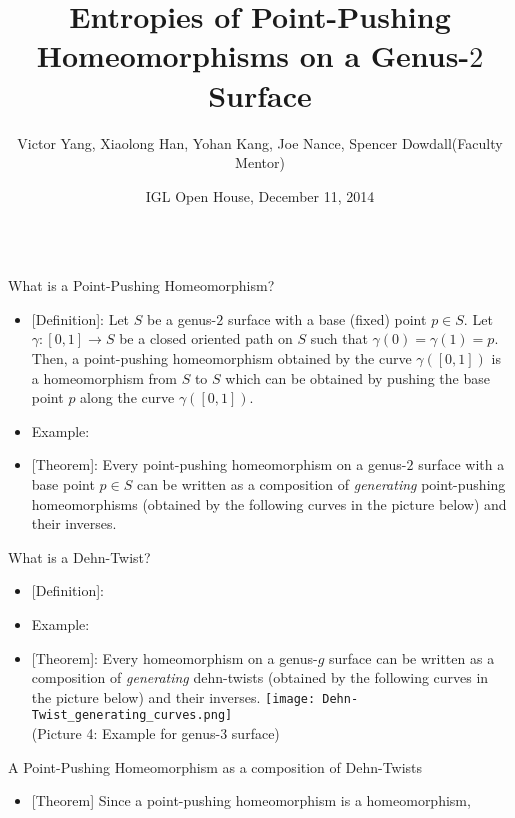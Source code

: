 \documentclass[leqno,presentation]{beamer}
\title{
\veryHuge
Entropies of Point-Pushing Homeomorphisms on a Genus-$2$ Surface}
\author{
  \LARGE
  Victor Yang,
  Xiaolong Han,
  Yohan Kang,
  Joe Nance,
  Spencer Dowdall(Faculty Mentor)}
\institute{
\raisebox{-2ex}{\texttt{[image: uiuc\_logo.pdf]}}
\hspace{4em}
\raisebox{-2ex}{\texttt{[image: igl-logo-small.png]}}
\hspace{1em} 
{\Large\textcolor{red!50!orange}{ Illinois Geometry Lab}}
}
\date{\large IGL Open House, December 11, 2014}
\begin{document}
\begin{frame}

\begin{block}{}
\titlepage
\end{block}

\begin{columns}[t]

\begin{column}[t]{.25\linewidth}

\begin{block}{What is a Point-Pushing Homeomorphism?}
\vspace{1ex}
\begin{itemize}
\item {[Definition]}: Let $S$ be a genus-$2$ surface with a base (fixed) point $p\in S$. Let $\gamma:[0,1]\to S$ be a closed oriented path on $S$ such that $\gamma(0)=\gamma(1)=p$. Then, a point-pushing homeomorphism obtained by the curve $\gamma([0,1])$ is a homeomorphism from $S$ to $S$ which can be obtained by pushing the base point $p$ along the curve $\gamma([0,1])$.
\item Example:
\item {[Theorem]}: Every point-pushing homeomorphism on a genus-$2$ surface with a base point $p\in S$ can be written as a composition of \textit{generating} point-pushing homeomorphisms (obtained by the following curves in the picture below) and their inverses.
\end{itemize}
\end{block}

\begin{block}{What is a Dehn-Twist?}
\vspace{1ex}
\begin{itemize}
\item {[Definition]}: 
\item Example:
\item {[Theorem]}: Every homeomorphism on a genus-$g$ surface can be written as a composition of \textit{generating} dehn-twists (obtained by the following curves in the picture below) and their inverses.
\texttt{[image: Dehn-Twist\_generating\_curves.png]}\\
(Picture 4: Example for genus-$3$ surface)
\end{itemize}
\end{block}

\begin{block}{A Point-Pushing Homeomorphism as a composition of Dehn-Twists}
\vspace{1ex}
\begin{itemize}
\item {[Theorem]} Since a point-pushing homeomorphism is a homeomorphism, 
\end{itemize}
\end{block}


\end{column}
\end{columns}
\end{frame}
\end{document}
